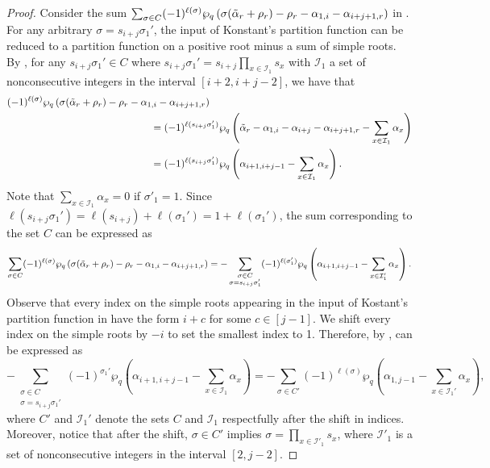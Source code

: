 \documentclass[10pt]{article}
\newcommand{\hr}[0]{\Tilde{\alpha}}
\newcommand{\qpartition}[1]{\wp_q\left(#1\right)}
\begin{document}
\begin{proof}
    Consider the sum $\sum_{\sigma\in C}(-1)^{\ell(\sigma)}\qpartition{\sigma(\hr_r+\rho_r)-\rho_r-\alpha_{1,i}-\alpha_{i+j+1,r}}$ in . 
    For any arbitrary $\sigma=s_{i+j}\sigma_1'$, the input of Konstant's partition function can be reduced to a partition function on a positive root minus a sum of simple roots. By , for any $s_{i+j}\sigma_1'\in C$ where $s_{i+j}\sigma_1'=s_{i+j}\prod_{x\in\mathcal{I}_1}s_x$ with $\mathcal{I}_1$ a set of nonconsecutive integers in the interval $[i+2,i+j-2]$, we have that
    \begin{align}
        &(-1)^{\ell(\sigma)}\qpartition{\sigma(\hr_r+\rho_r)-\rho_r-\alpha_{1,i}-\alpha_{i+j+1,r}} \notag\\
        &\hspace{5cm}=(-1)^{\ell(s_{i+j}\sigma_1')}\qpartition{\hr_r-\alpha_{1,i}-\alpha_{i+j}-\alpha_{i+j+1,r}-\sum_{x\in\mathcal{I}_1}\alpha_x} \notag \\
        &\hspace{5cm}= (-1)^{\ell(s_{i+j}\sigma_1')}\qpartition{\alpha_{i+1,i+j-1}-\sum_{x\in\mathcal{I}_1}\alpha_x}. \notag
    \end{align}
    Note that $\sum_{x\in\mathcal{I}_1}\alpha_x=0$ if $\sigma'_1=1$.
    Since $\ell(s_{i+j}\sigma_1')=\ell(s_{i+j})+\ell(\sigma_1')=1+\ell(\sigma_1')$, 
    the sum corresponding to the set $C$ can be expressed as
    \begin{equation}
    \sum_{\sigma\in C}(-1)^{\ell(\sigma)}\qpartition{\sigma(\hr_r+\rho_r)-\rho_r-\alpha_{1,i}-\alpha_{i+j+1,r}}=-\sum_{\substack{\sigma\in C \\ \sigma=s_{i+j}\sigma_1'}} (-1)^{\ell(\sigma_1')}\qpartition{\alpha_{i+1,i+j-1}-\sum_{x\in\mathcal{I}'_1}\alpha_x}.\label{case3 i}
    \end{equation}
    Observe that every index on the simple roots appearing in the input of Kostant's partition function in  have the form $i+c$ for some $c\in[j-1]$.
    We shift every index on the simple roots by $-i$ to set the smallest index to 1. Therefore, by ,  can be expressed as
    \begin{equation}
        -\sum_{\substack{\sigma\in C \\ \sigma=s_{i+j}\sigma_1'}} (-1)^{\sigma_1'}\qpartition{\alpha_{i+1,i+j-1}-\sum_{x\in\mathcal{I}_1}\alpha_x} = - \sum_{\sigma\in C'} (-1)^{\ell(\sigma)}\qpartition{\alpha_{1,j-1}-\sum_{x\in\mathcal{I}_1'}\alpha_x},\label{C'}
    \end{equation}
    where $C'$ and $\mathcal{I}_1'$ denote the sets $C$ and $\mathcal{I}_1$ respectfully after the shift in indices. 
    Moreover, notice that after the shift, $\sigma\in C'$ implies $\sigma = \prod_{x\in\mathcal{I}'_1}s_x$, where $\mathcal{I}'_1$ is a set of nonconsecutive integers in the interval $[2,j-2]$.


\end{proof}
\end{document}
